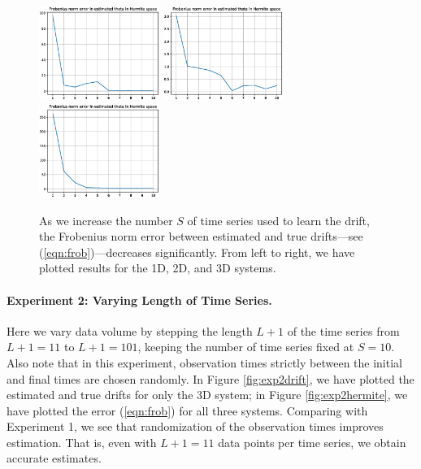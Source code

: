 \documentclass{article}
\begin{document}
\begin{figure}[th]
\begin{center}
\includegraphics[height=1.2in]{../1dcode/varying_num_timeseries/plots/hermite.eps}
\includegraphics[height=1.2in]{../2dcode/varying_num_timeseries/plots/hermite.eps}
\includegraphics[height=1.2in]{../3ddampedduffing/varying_num_timeseries/plots/hermite.eps}
\end{center}
\caption{As we increase the number $S$ of time series used to learn the drift, the Frobenius norm error between estimated and true drifts---see (\ref{eqn:frob})---decreases significantly.  From left to right, we have plotted results for the 1D, 2D, and 3D systems.}
\label{fig:exp1hermite}
\end{figure}

\paragraph{Experiment 2: Varying Length of Time Series.} Here we vary data volume by stepping the length $L+1$ of the time series from $L+1 = 11$ to $L+1 = 101$, keeping the number of time series fixed at $S=10$.  Also note that in this experiment, observation times strictly between the initial and final times are chosen randomly.  In Figure \ref{fig:exp2drift}, we have plotted the estimated and true drifts for only the 3D system; in Figure \ref{fig:exp2hermite}, we have plotted the error (\ref{eqn:frob}) for all three systems.  Comparing with Experiment 1, we see that randomization of the observation times improves estimation.  That is, even with $L+1 = 11$ data points per time series, we obtain accurate estimates.
\end{document}
